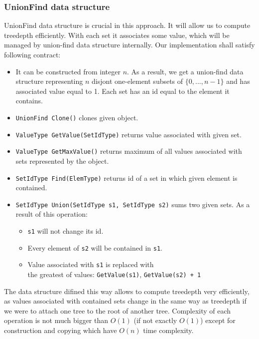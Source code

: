 \subsubsection{UnionFind data structure}
UnionFind data structure is crucial in this approach. It will allow us to compute treedepth efficiently. With each set it associates some value, which will be managed by union-find data structure internally. Our implementation shall satisfy following contract:
\begin{itemize}
	\item It can be constructed from integer $n$. As a result, we get a union-find data structure representing $n$ disjont one-element subsets of $\{0,...,n-1\}$ and has associated value equal to 1. Each set has an id equal to the element it contains.
	\item \texttt{UnionFind Clone()} clones given object.
	\item \texttt{ValueType GetValue(SetIdType)} returns value associated with given set.
	\item \texttt{ValueType GetMaxValue()} returns maximum of all values associated with sets represented by the object.
	\item \texttt{SetIdType Find(ElemType)} returns id of a set in which given element is contained.
	\item \texttt{SetIdType Union(SetIdType s1, SetIdType s2)} sums two given sets. As a result of this operation:
	\begin{itemize}
		\item \texttt{s1} will not change its id.
		\item Every element of \texttt{s2} will be contained in \texttt{s1}.
		\item Value associated with \texttt{s1} is replaced with \\ the greatest of values: \texttt{GetValue(s1)}, \texttt{GetValue(s2) + 1}
	\end{itemize}
\end{itemize}
The data structure difined this way allows to compute treedepth very efficiently, as values associated with contained sets change in the same way as treedepth if we were to attach one tree to the root of another tree. Complexity of each operation is not much bigger than $O(1)$ (if not exactly $O(1)$) except for construction and copying which have $O(n)$ time complexity.
